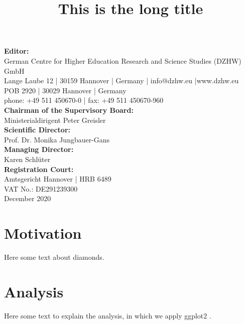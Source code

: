 \documentclass[a4paper,10pt]{article}
\begin{document}
\title{This is the long title}
\date{} %
\maketitle\thispagestyle{empty}
\newpage
\thispagestyle{empty}
\null\vfill
\footnotesize
\noindent\textbf{Editor:}\\
German Centre for Higher Education Research and Science Studies (DZHW) GmbH\\
Lange Laube 12 | 30159 Hannover | Germany | info@dzhw.eu |www.dzhw.eu\\
POB 2920 | 30029 Hannover | Germany\\
phone: +49 511 450670-0 | fax: +49 511 450670-960\\
\textbf{Chairman of the Supervisory Board:}\\
Ministerialdirigent Peter Greisler\\
\textbf{Scientific Director:}\\
Prof. Dr. Monika Jungbauer-Gans\\
\textbf{Managing Director:}\\
Karen Schlüter\\
\textbf{Registration Court:}\\
Amtsgericht Hannover | HRB 6489\\
VAT No.: DE291239300\\
December 2020
\newpage
\thispagestyle{empty}
\normalsize
{
\hypersetup{linkcolor=black}
\setcounter{tocdepth}{2}
\tableofcontents
}

\newpage
\clearpage
\setcounter{page}{1}
\hypertarget{motivation}{%
\section{Motivation}\label{motivation}}

Here some text about diamonds.

\hypertarget{analysis}{%
\section{Analysis}\label{analysis}}

Here some text to explain the analysis, in which we apply ggplot2 \autocite{Wickham2009}.
\end{document}
